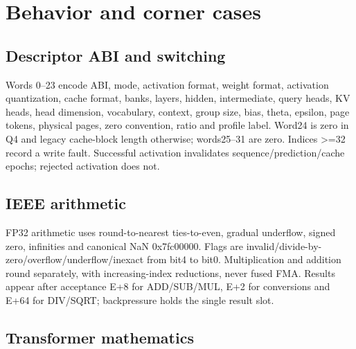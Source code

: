 \documentclass[11pt,a4paper]{article}
\begin{document}
\section{Behavior and corner cases}

\subsection{Descriptor ABI and switching}

Words 0–23 encode ABI,\allowbreak{} mode,\allowbreak{} activation format,\allowbreak{} weight format,\allowbreak{} activation quantization,\allowbreak{} cache format,\allowbreak{} banks,\allowbreak{} layers,\allowbreak{} hidden,\allowbreak{} intermediate,\allowbreak{} query heads,\allowbreak{} KV heads,\allowbreak{} head dimension,\allowbreak{} vocabulary,\allowbreak{} context,\allowbreak{} group size,\allowbreak{} bias,\allowbreak{} theta,\allowbreak{} epsilon,\allowbreak{} page tokens,\allowbreak{} physical pages,\allowbreak{} zero convention,\allowbreak{} ratio and profile label. Word24 is zero in Q4 and legacy cache-block length otherwise; words25–31 are zero. Indices >=\allowbreak{}32 record a write fault. Successful activation invalidates sequence/\allowbreak{}prediction/\allowbreak{}cache epochs; rejected activation does not.

\subsection{IEEE arithmetic}

FP32 arithmetic uses round-to-nearest ties-to-even,\allowbreak{} gradual underflow,\allowbreak{} signed zero,\allowbreak{} infinities and canonical NaN 0x7fc00000. Flags are invalid/\allowbreak{}divide-by-zero/\allowbreak{}overflow/\allowbreak{}underflow/\allowbreak{}inexact from bit4 to bit0. Multiplication and addition round separately,\allowbreak{} with increasing-index reductions,\allowbreak{} never fused FMA. Results appear after acceptance E+\allowbreak{}8 for ADD/\allowbreak{}SUB/\allowbreak{}MUL,\allowbreak{} E+\allowbreak{}2 for conversions and E+\allowbreak{}64 for DIV/\allowbreak{}SQRT; backpressure holds the single result slot.

\subsection{Transformer mathematics}
\end{document}
